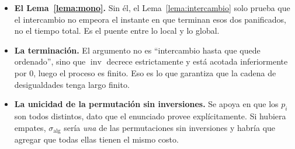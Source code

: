 \documentclass[11pt,a4paper]{article}
\theoremstyle{plain}
\theoremstyle{definition}
\theoremstyle{remark}
\newcommand{\inv}{\operatorname{inv}}
\begin{document}
\begin{itemize}
  \item \textbf{El Lema~\ref{lema:mono}.} Sin él, el Lema~\ref{lema:intercambio}
  solo prueba que el intercambio no empeora el instante en que terminan esos dos
  panificados, no el tiempo total. Es el puente entre lo local y lo global.

  \item \textbf{La terminación.} El argumento no es ``intercambio hasta que
  quede ordenado'', sino que $\inv$ decrece estrictamente y está acotada
  inferiormente por $0$, luego el proceso es finito. Eso es lo que garantiza que
  la cadena de desigualdades tenga largo finito.

  \item \textbf{La unicidad de la permutación sin inversiones.} Se apoya en que
  los $p_i$ son todos distintos, dato que el enunciado provee explícitamente. Si
  hubiera empates, $\sigma_{\mathrm{alg}}$ sería \emph{una} de las permutaciones
  sin inversiones y habría que agregar que todas ellas tienen el mismo costo.
\end{itemize}
\end{document}
